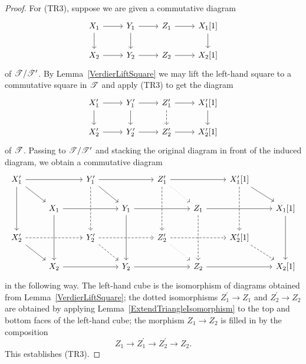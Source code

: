 \documentclass[dissertation.tex]{subfiles}
\begin{document}
\begin{thm}
\begin{proof}
    For (TR3), suppose we are given a commutative diagram
    $$\begin{tikzcd}
      X_1 \arrow{r}\arrow{d} & Y_1 \arrow{r}\arrow{d} & Z_1 \arrow{r} & X_1[1]\arrow{d}\\
      X_2 \arrow{r} & Y_2 \arrow{r} & Z_2 \arrow{r} & X_2[1]
    \end{tikzcd}$$
    of $\mathscr{T}/\mathscr{T}^\prime$.
    By Lemma~\ref{VerdierLiftSquare} we may lift the left-hand square to a commutative square in $\mathscr{T}$ and apply (TR3) to get the diagram
    $$\begin{tikzcd}
      X_1^\prime \arrow{r}\arrow{d} & Y_1^\prime \arrow{r}\arrow{d} & Z_1^\prime \arrow{r}\arrow[dashed]{d} & X_1^{\prime}[1] \arrow{d}\\
      X_2^\prime \arrow{r} & Y_2^\prime\arrow{r} & Z_2^\prime \arrow{r} & X_2^\prime[1]
    \end{tikzcd}$$
    of $\mathscr{T}$.
    Passing to $\mathscr{T}/\mathscr{T}^\prime$ and stacking the original diagram in front of the induced diagram, we obtain a commutative diagram 
    $$\begin{tikzcd}
      X_1^\prime \arrow{rr}\arrow{rd}\arrow{dd} & & Y_1^\prime \arrow{rr}\arrow{rd}\arrow[dashed]{dd} & & Z_1^\prime \arrow{rr}\arrow[dotted]{rd}\arrow[dashed]{dd} & & X_1^\prime[1]\arrow{rd}\arrow[dashed]{dd}\\
      & X_1\arrow{rr}\arrow{dd} & & Y_1\arrow{rr}\arrow{dd} & & Z_1\arrow{rr}\arrow[dashed]{dd} & & X_1[1]\arrow{dd}\\
      X_2^\prime \arrow{rd}\arrow[dashed]{rr}& & Y_2^\prime\arrow[dashed]{rr}\arrow[dashed]{rd} & & Z_2^\prime\arrow[dashed]{rr}\arrow[dotted]{rd} & & X_2^\prime[1]\arrow[dashed]{rd}\\
      & X_2 \arrow{rr}& & Y_2\arrow{rr} & & Z_2\arrow{rr} & & X_2[1]
    \end{tikzcd}$$
    in the following way.
    The left-hand cube is the isomorphism of diagrams obtained from Lemma~\ref{VerdierLiftSquare}; 
    the dotted isomorphisms $Z_1^\prime \to Z_1$ and $Z_2^\prime \to Z_2$ are obtained by applying Lemma~\ref{ExtendTriangleIsomorphism} to the top and bottom faces of the left-hand cube;
    the morphism $Z_1 \rightarrow Z_2$ is filled in by the composition 
    $$Z_1 \to Z_1^\prime \to Z_2^\prime \to Z_2.$$
    This establishes (TR3).
    

\end{proof}
\end{thm}
\end{document}
